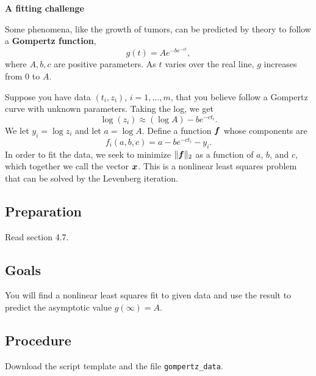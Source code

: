 \documentclass[11pt]{article}
\begin{document}
\begin{center}
  \bf A fitting challenge
\end{center}

Some phenomena, like the growth of tumors, can be predicted by theory to follow a \textbf{Gompertz function},
\begin{equation}
  \label{g}
  g(t) = A e^{-b e^{-ct}},
\end{equation}
where $A,b,c$ are positive parameters. As $t$ varies over the real line, $g$ increases from 0 to $A$. 

Suppose you have data $(t_i,z_i)$, $i=1,\dots,m$, that you believe follow a Gompertz curve with unknown parameters. Taking the log, we get
\begin{equation}
  \label{logdata}
  \log(z_i) \approx (\log A) - b e^{-c t_i}.
\end{equation}
We let $y_i=\log z_i$ and let $a=\log A$. Define a function $\bm{f}$ whose components are
\begin{equation}
	\label{f}
	f_i(a,b,c) = a - b e^{-c t_i} - y_i.
\end{equation}
In order to fit the data, we seek to minimize $\|\bm{f}\|_2$ as a function of $a$, $b$, and $c$, which together we call the vector $\bm{x}$. This is a nonlinear least squares problem that can be solved by the Levenberg iteration.

\subsection*{Preparation}

Read section 4.7. 


\subsection*{Goals}

You will find a nonlinear least squares fit to given data and use the result to predict the asymptotic value $g(\infty)=A$. 

\subsection*{Procedure}

Download the script template and the file \texttt{gompertz\_data}.
\end{document}
